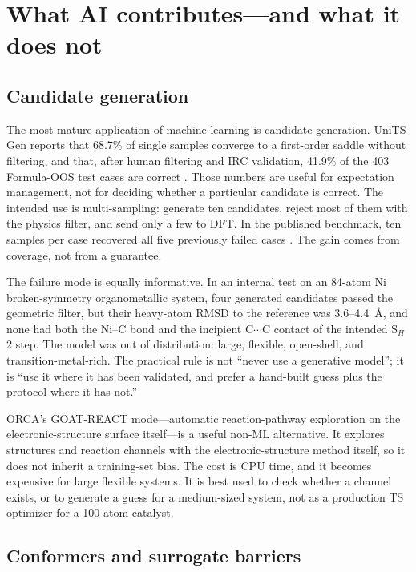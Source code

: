 \documentclass[11pt,a4paper]{article}
\begin{document}
\section{What AI contributes---and what it does not}

\subsection{Candidate generation}

The most mature application of machine learning is candidate generation. UniTS-Gen reports that 68.7\% of single samples converge to a first-order saddle without filtering, and that, after human filtering and IRC validation, 41.9\% of the 403 Formula-OOS test cases are correct \citep{Xu2026UniTS}. Those numbers are useful for expectation management, not for deciding whether a particular candidate is correct. The intended use is multi-sampling: generate ten candidates, reject most of them with the physics filter, and send only a few to DFT. In the published benchmark, ten samples per case recovered all five previously failed cases \citep{Xu2026UniTS}. The gain comes from coverage, not from a guarantee.

The failure mode is equally informative. In an internal test on an 84-atom Ni broken-symmetry organometallic system, four generated candidates passed the geometric filter, but their heavy-atom RMSD to the reference was 3.6--4.4~\AA{}, and none had both the Ni--C bond and the incipient C$\cdots$C contact of the intended S$_H$2 step. The model was out of distribution: large, flexible, open-shell, and transition-metal-rich. The practical rule is not ``never use a generative model''; it is ``use it where it has been validated, and prefer a hand-built guess plus the protocol where it has not.''

ORCA's GOAT-REACT mode---automatic reaction-pathway exploration on the electronic-structure surface itself---is a useful non-ML alternative. It explores structures and reaction channels with the electronic-structure method itself, so it does not inherit a training-set bias. The cost is CPU time, and it becomes expensive for large flexible systems. It is best used to check whether a channel exists, or to generate a guess for a medium-sized system, not as a production TS optimizer for a 100-atom catalyst.

\subsection{Conformers and surrogate barriers}
\end{document}
